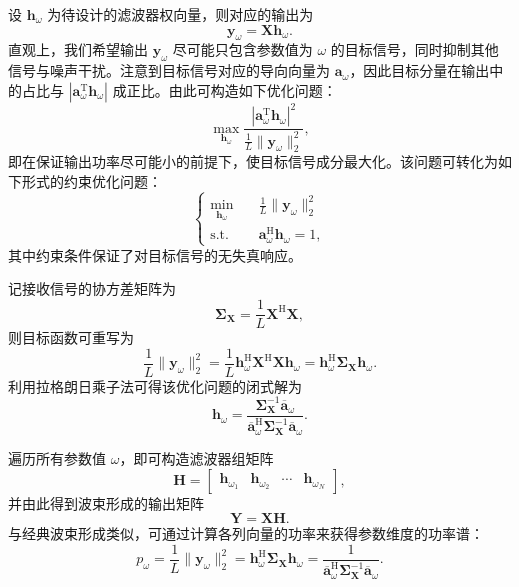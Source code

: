 设 \( \bm{h}_{\omega} \) 为待设计的滤波器权向量，则对应的输出为
\[
    \bm{y}_{\omega} = \mathbf{X} \bm{h}_{\omega}.
\]
直观上，我们希望输出 \(\bm{y}_{\omega}\) 尽可能只包含参数值为 \(\omega\) 的目标信号，同时抑制其他信号与噪声干扰。注意到目标信号对应的导向向量为 \(\bm{a}_{\omega}\)，因此目标分量在输出中的占比与 \(|\bm{a}_{\omega}^{\mathrm{T}} \bm{h}_{\omega}|\) 成正比。由此可构造如下优化问题：
\[
    \max_{\bm{h}_{\omega}} \frac{|\bm{a}_{\omega}^{\mathrm{T}} \bm{h}_{\omega}|^2}{ \frac{1}{L} \|\bm{y}_{\omega}\|_2^2},
\]
即在保证输出功率尽可能小的前提下，使目标信号成分最大化。该问题可转化为如下形式的约束优化问题：
\[
    \begin{cases}
        \min_{\bm{h}_{\omega}} \quad & \frac{1}{L} \|\bm{y}_{\omega}\|_2^2               \\
        \text{s.t.} \quad            & \bm{a}_{\omega}^{\mathrm{H}} \bm{h}_{\omega} = 1,
    \end{cases}
\]
其中约束条件保证了对目标信号的无失真响应。

记接收信号的协方差矩阵为
\[
    \mathbf{\Sigma}_{\mathbf{X}} = \frac{1}{L} \mathbf{X}^{\mathrm{H}} \mathbf{X},
\]
则目标函数可重写为
\[
    \frac{1}{L} \|\bm{y}_{\omega}\|_2^2
    = \frac{1}{L} \bm{h}_{\omega}^{\mathrm{H}} \mathbf{X}^{\mathrm{H}} \mathbf{X} \bm{h}_{\omega}
    = \bm{h}_{\omega}^{\mathrm{H}} \mathbf{\Sigma}_{\mathbf{X}} \bm{h}_{\omega}.
\]
利用拉格朗日乘子法可得该优化问题的闭式解为
\[
    \bm{h}_{\omega}
    = \frac{\mathbf{\Sigma}_{\mathbf{X}}^{-1} \overline{\bm{a}}_{\omega}}
    {\overline{\bm{a}}_{\omega}^{\mathrm{H}} \mathbf{\Sigma}_{\mathbf{X}}^{-1} \overline{\bm{a}}_{\omega}}.
\]

遍历所有参数值 \(\omega\)，即可构造滤波器组矩阵
\[
    \mathbf{H} = \begin{bmatrix} \bm{h}_{\omega_1} & \bm{h}_{\omega_2} & \cdots & \bm{h}_{\omega_N} \end{bmatrix},
\]
并由此得到波束形成的输出矩阵
\[
    \mathbf{Y} = \mathbf{X} \mathbf{H}.
\]
与经典波束形成类似，可通过计算各列向量的功率来获得参数维度的功率谱：
\[
    p_{\omega}
    = \frac{1}{L} \|\bm{y}_{\omega}\|_2^2
    = \bm{h}_{\omega}^{\mathrm{H}} \mathbf{\Sigma}_{\mathbf{X}} \bm{h}_{\omega}
    = \frac{1}{\overline{\bm{a}}_{\omega}^{\mathrm{H}} \mathbf{\Sigma}_{\mathbf{X}}^{-1} \overline{\bm{a}}_{\omega}}.
\]

